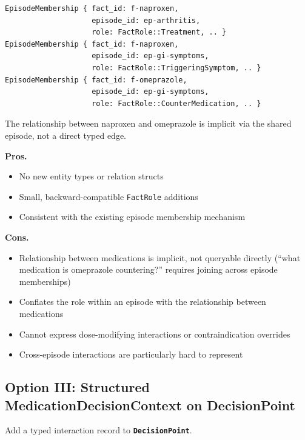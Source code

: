 \documentclass[11pt]{article}
\newcommand{\entity}[1]{\texttt{\textbf{#1}}}
\newcommand{\field}[1]{\texttt{#1}}
\newenvironment{prosbox}{%
  \begin{mdframed}[backgroundcolor=notegreen,
    linecolor=noteborder, linewidth=1pt,
    innertopmargin=8pt, innerbottommargin=8pt,
    innerleftmargin=10pt, innerrightmargin=10pt]
  \small
}{%
  \end{mdframed}
}
\newenvironment{consbox}{%
  \begin{mdframed}[backgroundcolor=warningyellow,
    linecolor=warningborder, linewidth=1pt,
    innertopmargin=8pt, innerbottommargin=8pt,
    innerleftmargin=10pt, innerrightmargin=10pt]
  \small
}{%
  \end{mdframed}
}
\begin{document}
\begin{lstlisting}
EpisodeMembership { fact_id: f-naproxen,
                    episode_id: ep-arthritis,
                    role: FactRole::Treatment, .. }
EpisodeMembership { fact_id: f-naproxen,
                    episode_id: ep-gi-symptoms,
                    role: FactRole::TriggeringSymptom, .. }
EpisodeMembership { fact_id: f-omeprazole,
                    episode_id: ep-gi-symptoms,
                    role: FactRole::CounterMedication, .. }
\end{lstlisting}

The relationship between naproxen and omeprazole is implicit via the
shared episode, not a direct typed edge.

\begin{prosbox}
\textbf{Pros.}
\begin{itemize}[noitemsep]
  \item No new entity types or relation structs
  \item Small, backward-compatible \field{FactRole} additions
  \item Consistent with the existing episode membership mechanism
\end{itemize}
\end{prosbox}

\begin{consbox}
\textbf{Cons.}
\begin{itemize}[noitemsep]
  \item Relationship between medications is implicit, not queryable
    directly (``what medication is omeprazole countering?'' requires
    joining across episode memberships)
  \item Conflates the role within an episode with the relationship
    between medications
  \item Cannot express dose-modifying interactions or contraindication
    overrides
  \item Cross-episode interactions are particularly hard to represent
\end{itemize}
\end{consbox}

\subsection{Option III: Structured MedicationDecisionContext on DecisionPoint}
\label{sec:interaction-option-iii}

Add a typed interaction record to \entity{DecisionPoint}.
\end{document}
